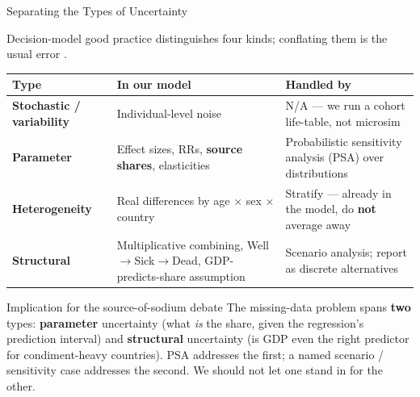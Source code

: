 \documentclass[
  11pt,
  ignorenonframetext,
  aspectratio=169]{beamer}
\begin{document}
\begin{frame}{Separating the Types of Uncertainty}
\label{separating-the-types-of-uncertainty}
\justifying
\scriptsize

Decision-model good practice distinguishes four kinds; conflating them
is the usual error \autocite{briggs2012}.

\medskip
\renewcommand{\arraystretch}{1.25}
\begin{tabular}{>{\bfseries}p{2.3cm} p{4.6cm} p{4.6cm}}
\toprule
\textbf{Type} & \textbf{In our model} & \textbf{Handled by} \\
\midrule
Stochastic / variability & Individual-level noise & N/A --- we run a cohort life-table, not microsim \\
Parameter & Effect sizes, RRs, \textbf{source shares}, elasticities & Probabilistic sensitivity analysis (PSA) over distributions \\
Heterogeneity & Real differences by age $\times$ sex $\times$ country & Stratify --- already in the model, do \textbf{not} average away \\
Structural & Multiplicative combining, Well$\to$Sick$\to$Dead, GDP-predicts-share assumption & Scenario analysis; report as discrete alternatives \\
\bottomrule
\end{tabular}

\medskip
\begin{uncertaintyblock}{Implication for the source-of-sodium debate}
\scriptsize
The missing-data problem spans \textbf{two} types: \textbf{parameter} uncertainty (what \emph{is} the share, given the regression's prediction interval) and \textbf{structural} uncertainty (is GDP even the right predictor for condiment-heavy countries). PSA addresses the first; a named scenario / sensitivity case addresses the second. We should not let one stand in for the other.
\end{uncertaintyblock}
\end{frame}
\end{document}

